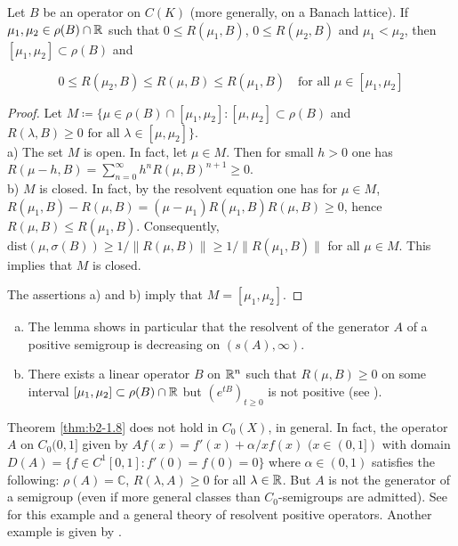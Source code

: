 \begin{lemma}\label{lem:b2-1.9}
Let $B$ be an operator on $C(K)$ (more generally, on a Banach lattice).
If $\mu_{1}, \mu_{2} \in \rho(B) \cap \mathbb{R}$ such that $0 \leq R(\mu_{1},B)$, $0 \leq R(\mu_{2},B)$ and $\mu_{1} < \mu_{2}$, then $[\mu_{1},\mu_{2}] \subset \rho(B)$ and

\[
    0 \leq R(\mu_{2},B) \leq R(\mu,B) \leq R(\mu_{1},B) \quad \text{for all } \mu \in [\mu_{1},\mu_{2}]
\]
\end{lemma}
\begin{proof}
Let $M \coloneqq \{\mu \in \rho(B) \cap [\mu_{1},\mu_{2}] \colon [\mu,\mu_{2}] \subset \rho(B)$  and $R(\lambda,B) \geq 0 \text{ for all } \lambda \in [\mu,\mu_{2}]\}$.
\\
a) The set $M$ is open.
In fact, let $\mu \in M$.
Then for small $h > 0$ one has $R(\mu-h,B) = \sum_{n=0}^{\infty} h^{n}R(\mu,B)^{n+1} \geq 0$.
\\
b) $M$ is closed.
In fact, by the resolvent equation one has for $\mu \in M$, $R(\mu_{1},B) - R(\mu,B) = (\mu - \mu_{1})R(\mu_{1},B)R(\mu,B) \geq 0$, hence $R(\mu,B) \leq R(\mu_{1},B)$.
Consequently, $\text{dist}(\mu,\sigma(B)) \geq 1/\|R(\mu,B)\| \geq 1/\|R(\mu_{1},B)\|$ for all $\mu \in M$.
This implies that $M$ is closed.

The assertions a) and b) imply that $M = [\mu_{1},\mu_{2}]$.
\end{proof}
\begin{remark*}\label{rem:b2-1.9-kgk1}
\begin{enumerate}[a), wide, labelsep=1em]
\item \label{rem:b2-1.9-1}
The lemma shows in particular that the resolvent of the generator $A$ of a positive semigroup is decreasing on $(s(A),\infty)$.

\item \label{rem:b2-1.9-2}
There exists a linear operator $B$ on $\mathbb{R}^{n}$ such that $R(\mu,B) \geq 0$ on some interval $[\mu_{1},\mu_{2}] \subset \rho(B) \cap \mathbb{R}$ but $(e^{tB})_{t \geq 0}$ is not positive (see \citet{greinervoigtwolff:1981}
).
\end{enumerate}
\end{remark*}

\begin{remark*}\label{rem:b2-1.9-kgk2}
Theorem \ref{thm:b2-1.8} does not hold in $C_{0}(X)$, in general.
In fact, the operator $A$ on $C_{0}(0,1]$ given by $Af(x) = f'(x) + \alpha/x f(x)$ $(x \in (0,1])$ with domain $D(A) = \{f \in C^{1}[0,1] \colon f'(0) = f(0) = 0\}$ where $\alpha \in (0,1)$ satisfies the following: $\rho(A) = \mathbb{C}$, $R(\lambda,A) \geq 0$ for all $\lambda \in \mathbb{R}$.
But $A$ is not the generator of a semigroup (even if more general classes than $C_{0}$-semigroups are admitted).
See \citet{Arendt:1985b} for this example and a general theory of resolvent positive operators.
Another example is given by \citet{battydavies:1983}.
\end{remark*}

